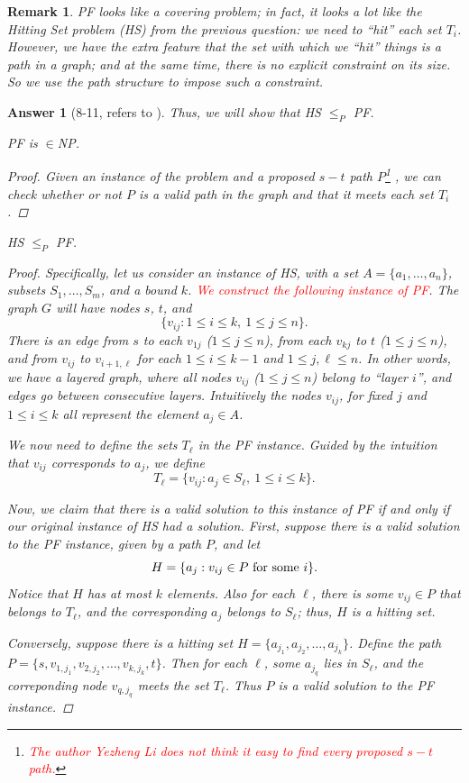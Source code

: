\documentclass[11pt]{article}
\theoremstyle{numberplain}
\theoremstyle{nonumberplain}
\newtheorem{proof}{Proof}
\newtheorem{rem}{Remark}
\newtheorem{ans}{Answer}
\newcommand{\0}{{\mathbf{0}}}
\begin{document}
\begin{rem}
PF looks like a covering problem;
in fact, it looks a lot like the Hitting Set problem (HS) from
the previous question:
we need to ``hit'' each set $T_i$.
However, we have the extra feature that
the set with which we ``hit'' things is a path in a graph;
and at the same time, there is no explicit constraint on its size.
So we use the path structure to impose such a constraint.
\end{rem}
\begin{ans}[8-11, refers to \cite{solcornell}]
Thus, we will show that HS $\leq_P$ PF.
\begin{State}[Claim 1]
PF is $\in$NP.
\end{State}
\begin{proof} Given an instance of the problem and a proposed $s-t$ path $P$\footnote{
\textcolor{red}{The author Yezheng Li does not think it easy to find every proposed $s-t$ path.}}
, 
we can check whether or not $P$ is a valid path in the graph and that it meets each set $T_i$. 
\end{proof}
\begin{State}[Claim 2]
HS $\leq_P$ PF.
\end{State}
\begin{proof}
Specifically, let us consider an instance of HS,
with a set $A = \{a_1, \ldots, a_n\}$, subsets 
$S_1, \ldots, S_m$, and a bound $k$.
\textcolor{red}{We construct the following instance of PF}.
The graph $G$ will have nodes 
$s$, $t$, and
$$\{v_{ij} : 1 \leq i \leq k, ~ 1 \leq j \leq n\}.$$
There is an edge from $s$ to each $v_{1j}$ ($1 \leq j \leq n$),
from each $v_{kj}$ to $t$ ($1 \leq j \leq n$),
and from $v_{ij}$ to $v_{i+1,\ell}$ for each
$1 \leq i \leq k-1$ and $1 \leq j, \ell \leq n$.
In other words, we have a {\em layered graph},
where all nodes $v_{ij}$ ($1 \leq j \leq n$)
belong to ``layer $i$'', and edges go between consecutive layers.
Intuitively the nodes $v_{ij}$, for fixed $j$ and
$1 \leq i \leq k$ all represent the element $a_j \in A$.

We now need to define the sets $T_\ell$ in the PF instance.
Guided by the intuition that $v_{ij}$ corresponds to $a_j$,
we define 
$$T_\ell = \{v_{i j} : a_j \in S_{\ell}, ~ 1 \leq i \leq k\}.$$

Now, we claim that there is a valid solution to this instance
of PF if and only if our original instance of HS had a solution.
First, suppose there is a valid solution to the PF instance,
given by a path $P$, and let 
$$H = \{a_j : v_{ij} \in P ~ {\rm for ~ some} ~ i\}.$$
Notice that $H$ has at most $k$ elements.
Also for each $\ell$, there is some $v_{ij} \in P$
that belongs to $T_\ell$, and the corresponding $a_j$ belongs to $S_\ell$;
thus, $H$ is a hitting set.

Conversely, suppose there is a hitting set $H = \{a_{j_1}, a_{j_2}, 
\ldots, a_{j_k}\}$.
Define the path $P = \{s, v_{1,j_1}, v_{2,j_2}, \ldots, v_{k,j_k}, t\}$.
Then for each $\ell$, some $a_{j_q}$ lies in $S_\ell$,
and the correponding node $v_{q,j_q}$ meets the set $T_\ell$.
Thus $P$ is a valid solution to the PF instance.
\end{proof}
\end{ans}
\end{document}
